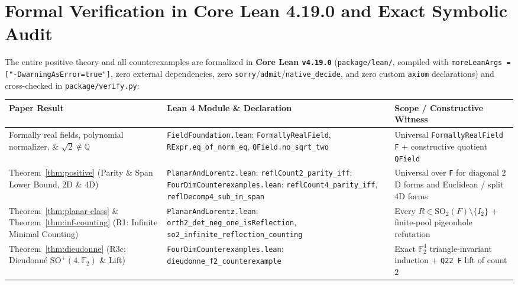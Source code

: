 \documentclass[11pt,a4paper]{article}
\theoremstyle{plain}
\theoremstyle{definition}
\newcommand{\Q}{\mathbb{Q}}
\newcommand{\F}{\mathbb{F}}
\newcommand{\SO}{\mathrm{SO}}
\begin{document}
\section{Formal Verification in Core Lean 4.19.0 and Exact Symbolic Audit}

The entire positive theory and all counterexamples are formalized in \textbf{Core Lean \texttt{v4.19.0}} (\texttt{package/lean/}, compiled with \texttt{moreLeanArgs = ["-DwarningAsError=true"]}, zero external dependencies, zero \texttt{sorry}/\texttt{admit}/\texttt{native\_decide}, and zero custom \texttt{axiom} declarations) and cross-checked in \texttt{package/verify.py}:

\begin{table}[ht]
\centering
\footnotesize
\setlength{\tabcolsep}{4.5pt}
\begin{tabular}{>{\raggedright\arraybackslash}p{4.0cm}>{\raggedright\arraybackslash}p{5.7cm}>{\raggedright\arraybackslash}p{5.0cm}}
\hline
\textbf{Paper Result} & \textbf{Lean 4 Module \& Declaration} & \textbf{Scope / Constructive Witness} \\
\hline
Formally real fields, polynomial normalizer, \& $\sqrt{2} \notin \Q$ &
\texttt{FieldFoundation.lean}: \texttt{FormallyRealField}, \texttt{RExpr.eq\_\allowbreak of\_\allowbreak norm\_\allowbreak eq}, \texttt{QField.no\_\allowbreak sqrt\_\allowbreak two} &
Universal \texttt{FormallyRealField F} + constructive quotient \texttt{QField} \\
\hline
Theorem~\ref{thm:positive} (Parity \& Span Lower Bound, $2$D \& $4$D) &
\texttt{PlanarAndLorentz.lean}: \texttt{reflCount2\_\allowbreak parity\_\allowbreak iff}; \texttt{FourDimCounterexamples.lean}: \texttt{reflCount4\_\allowbreak parity\_\allowbreak iff}, \texttt{reflDecomp4\_\allowbreak sub\_\allowbreak in\_\allowbreak span} &
Universal over \texttt{F} for diagonal $2$D forms and Euclidean / split $4$D forms \\
\hline
Theorem~\ref{thm:planar-class} \& Theorem~\ref{thm:inf-counting} (R1: Infinite Minimal Counting) &
\texttt{PlanarAndLorentz.lean}: \texttt{orth2\_\allowbreak det\_\allowbreak neg\_\allowbreak one\_\allowbreak isReflection}, \texttt{so2\_\allowbreak infinite\_\allowbreak reflection\_\allowbreak counting} &
Every $R \in \SO_2(F) \setminus \{I_2\}$ + finite-pool pigeonhole refutation \\
\hline
Theorem~\ref{thm:dieudonne} (R3c: Dieudonn\'e $\SO^+(4, \F_2)$ \& Lift) &
\texttt{FourDimCounterexamples.lean}: \texttt{dieudonne\_\allowbreak f2\_\allowbreak counterexample} &
Exact $\F_2^4$ triangle-invariant induction + \texttt{Q22 F} lift of count $2$ \\

\end{tabular}
\end{table}
\end{document}
